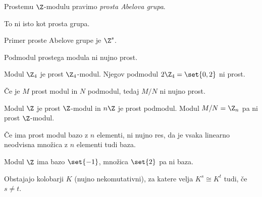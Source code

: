 \begin{definicija}
    Prostemu $\Z$-modulu pravimo \emph{prosta Abelova grupa}.
\end{definicija}

\begin{opomba}
    To ni isto kot prosta grupa.
\end{opomba}

\begin{primer}
    Primer proste Abelove grupe je $\Z^s$.
\end{primer}

\begin{opomba}
    Podmodul prostega modula ni nujno prost.
\end{opomba}

\begin{primer}
    Modul $\Z_4$ je prost $\Z_4$-modul. Njegov podmodul $2\Z_4 = \set{0, 2}$ ni prost.
\end{primer}

\begin{opomba}
    Če je $M$ prost modul in $N$ podmodul, tedaj $M/N$ ni nujno prost.
\end{opomba}

\begin{primer}
    Modul $\Z$ je prost $\Z$-modul in $n\Z$ je prost podmodul. Modul $M/N = \Z_n$ pa ni prost 
    $\Z$-modul.
\end{primer}

\begin{opomba}
    Če ima prost modul bazo z $n$ elementi, ni nujno res, da je vsaka linearno neodvisna 
    množica z $n$ elementi tudi baza.
\end{opomba}

\begin{primer}
    Modul $\Z$ ima bazo $\set{-1}$, množica $\set{2}$ pa ni baza.
\end{primer}

\begin{opomba}
    Obstajajo kolobarji $K$ (nujno nekomutativni), za katere velja $K^s \cong K^t$ tudi, če
    $s \neq t$.
\end{opomba}

